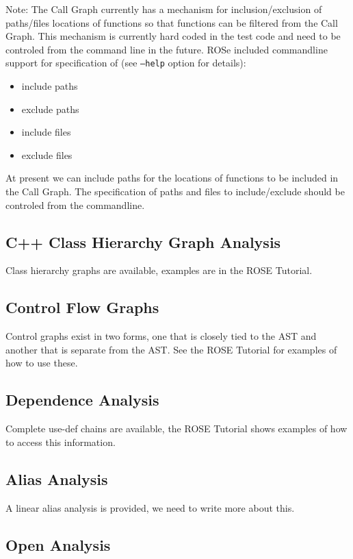 Note:  The Call Graph currently has a mechanism for inclusion/exclusion of
paths/files locations of functions so that functions can be filtered from the
Call Graph.  This mechanism is currently hard coded in the test code and need
to be controled from the command line in the future.  ROSe included commandline
support for specification of (see {\tt --help} option for details):
\begin{itemize}
   \item include paths
   \item exclude paths
   \item include files
   \item exclude files
\end{itemize}

At present we can include paths for 
the locations of functions to be included in the Call Graph. The specification of
paths and files to include/exclude should be controled from the commandline.


\subsection{C++ Class Hierarchy Graph Analysis}

   Class hierarchy graphs are available, examples are in the
ROSE Tutorial.

\subsection{Control Flow Graphs}

   Control graphs exist in two forms, one that is closely tied to
the AST and another that is separate from the AST.  See the ROSE
Tutorial for examples of how to use these.

\subsection{Dependence Analysis}

   Complete use-def chains are available, the ROSE Tutorial shows examples of
how to access this information.

\subsection{Alias Analysis}

   A linear alias analysis is provided, we need to write more about this.


\subsection{Open Analysis}

